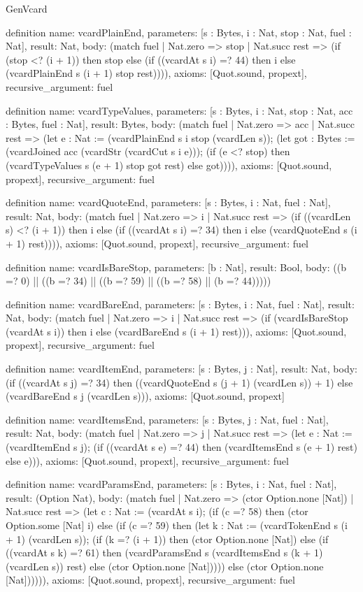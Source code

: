 \begin{lexlean}{GenVcard}
\begin{semanticmodule}
definition{
  name: vcardPlainEnd,
  parameters: [s : Bytes, i : Nat, stop : Nat, fuel : Nat],
  result: Nat,
  body: (match fuel
    | Nat.zero => stop
    | Nat.succ rest => (if (stop <? (i + 1)) then stop else (if ((vcardAt s i) =? 44) then i else (vcardPlainEnd s (i + 1) stop rest)))),
  axioms: [Quot.sound, propext],
  recursive_argument: fuel
}

definition{
  name: vcardTypeValues,
  parameters: [s : Bytes, i : Nat, stop : Nat, acc : Bytes, fuel : Nat],
  result: Bytes,
  body: (match fuel
    | Nat.zero => acc
    | Nat.succ rest => (let e : Nat := (vcardPlainEnd s i stop (vcardLen s)); (let got : Bytes := (vcardJoined acc (vcardStr (vcardCut s i e))); (if (e <? stop) then (vcardTypeValues s (e + 1) stop got rest) else got)))),
  axioms: [Quot.sound, propext],
  recursive_argument: fuel
}

definition{
  name: vcardQuoteEnd,
  parameters: [s : Bytes, i : Nat, fuel : Nat],
  result: Nat,
  body: (match fuel
    | Nat.zero => i
    | Nat.succ rest => (if ((vcardLen s) <? (i + 1)) then i else (if ((vcardAt s i) =? 34) then i else (vcardQuoteEnd s (i + 1) rest)))),
  axioms: [Quot.sound, propext],
  recursive_argument: fuel
}

definition{
  name: vcardIsBareStop,
  parameters: [b : Nat],
  result: Bool,
  body: ((b =? 0) || ((b =? 34) || ((b =? 59) || ((b =? 58) || (b =? 44)))))
}

definition{
  name: vcardBareEnd,
  parameters: [s : Bytes, i : Nat, fuel : Nat],
  result: Nat,
  body: (match fuel
    | Nat.zero => i
    | Nat.succ rest => (if (vcardIsBareStop (vcardAt s i)) then i else (vcardBareEnd s (i + 1) rest))),
  axioms: [Quot.sound, propext],
  recursive_argument: fuel
}

definition{
  name: vcardItemEnd,
  parameters: [s : Bytes, j : Nat],
  result: Nat,
  body: (if ((vcardAt s j) =? 34) then ((vcardQuoteEnd s (j + 1) (vcardLen s)) + 1) else (vcardBareEnd s j (vcardLen s))),
  axioms: [Quot.sound, propext]
}

definition{
  name: vcardItemsEnd,
  parameters: [s : Bytes, j : Nat, fuel : Nat],
  result: Nat,
  body: (match fuel
    | Nat.zero => j
    | Nat.succ rest => (let e : Nat := (vcardItemEnd s j); (if ((vcardAt s e) =? 44) then (vcardItemsEnd s (e + 1) rest) else e))),
  axioms: [Quot.sound, propext],
  recursive_argument: fuel
}

definition{
  name: vcardParamsEnd,
  parameters: [s : Bytes, i : Nat, fuel : Nat],
  result: (Option Nat),
  body: (match fuel
    | Nat.zero => (ctor Option.none [Nat])
    | Nat.succ rest => (let c : Nat := (vcardAt s i); (if (c =? 58) then (ctor Option.some [Nat] i) else (if (c =? 59) then (let k : Nat := (vcardTokenEnd s (i + 1) (vcardLen s)); (if (k =? (i + 1)) then (ctor Option.none [Nat]) else (if ((vcardAt s k) =? 61) then (vcardParamsEnd s (vcardItemsEnd s (k + 1) (vcardLen s)) rest) else (ctor Option.none [Nat])))) else (ctor Option.none [Nat]))))),
  axioms: [Quot.sound, propext],
  recursive_argument: fuel
}


\end{semanticmodule}
\end{lexlean}

